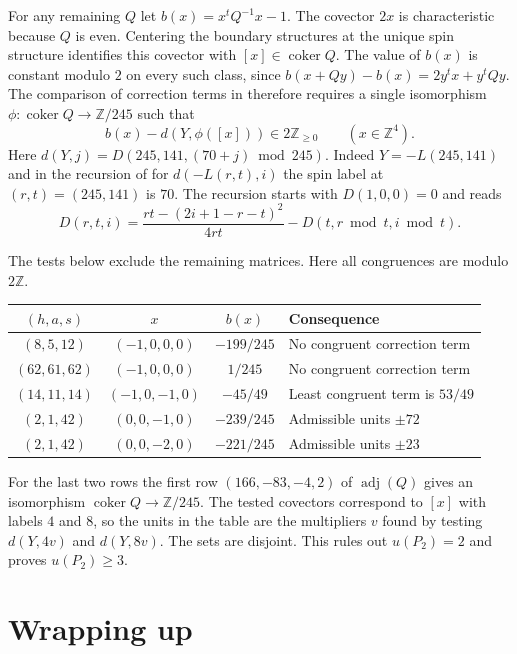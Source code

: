 \documentclass[a4paper,11pt]{amsart}
\numberwithin{equation}{subsection}
\theoremstyle{plain}
\theoremstyle{remark}
\begin{document}
For any remaining $Q$ let $b(x)=x^tQ^{-1}x-1$. The covector $2x$ is characteristic because $Q$ is even. Centering the boundary structures at the unique spin structure identifies this covector with $[x]\in\operatorname{coker}Q$. The value of $b(x)$ is constant modulo $2$ on every such class, since $b(x+Qy)-b(x)=2y^tx+y^tQy$. The comparison of correction terms in \cite[Theorem~1]{Owens} therefore requires a single isomorphism $\phi\colon\operatorname{coker}Q\to\mathbb{Z}/245$ such that
\[
b(x)-d(Y,\phi([x]))\in2\mathbb Z_{\geq0}\qquad(x\in\mathbb Z^4).
\]
Here $d(Y,j)=D(245,141,(70+j)\bmod245)$. Indeed $Y=-L(245,141)$ and in the recursion of \cite[Proposition~4.8]{OSz} for $d(-L(r,t),i)$ the spin label at $(r,t)=(245,141)$ is $70$. The recursion starts with $D(1,0,0)=0$ and reads
\[
D(r,t,i)=\frac{rt-(2i+1-r-t)^2}{4rt}
-D(t,r\bmod t,i\bmod t).
\]
\begin{samepage}
The tests below exclude the remaining matrices. Here all congruences are modulo $2\mathbb Z$.
\begin{center}
\begin{tabular}{@{}c c c l@{}}
\toprule
$(h,a,s)$ & $x$ & $b(x)$ & Consequence \\
\midrule
$(8,5,12)$ & $(-1,0,0,0)$  & $-199/245$ & No congruent correction term \\
$(62,61,62)$ & $(-1,0,0,0)$  & $1/245$ & No congruent correction term \\
$(14,11,14)$ & $(-1,0,-1,0)$ & $-45/49$ & Least congruent term is $53/49$ \\
$(2,1,42)$ & $(0,0,-1,0)$  & $-239/245$ & Admissible units $\pm72$ \\
$(2,1,42)$ & $(0,0,-2,0)$  & $-221/245$ & Admissible units $\pm23$ \\
\bottomrule
\end{tabular}
\end{center}
\end{samepage}
For the last two rows the first row $(166,-83,-4,2)$ of $\operatorname{adj}(Q)$ gives an isomorphism $\operatorname{coker}Q\to\mathbb Z/245$. The tested covectors correspond to $[x]$ with labels $4$ and $8$, so the units in the table are the multipliers $v$ found by testing $d(Y,4v)$ and $d(Y,8v)$. The sets are disjoint. This rules out $u(P_2)=2$ and proves $u(P_2)\geq3$.

\section{Wrapping up}\label{sec:cor}
\end{document}
